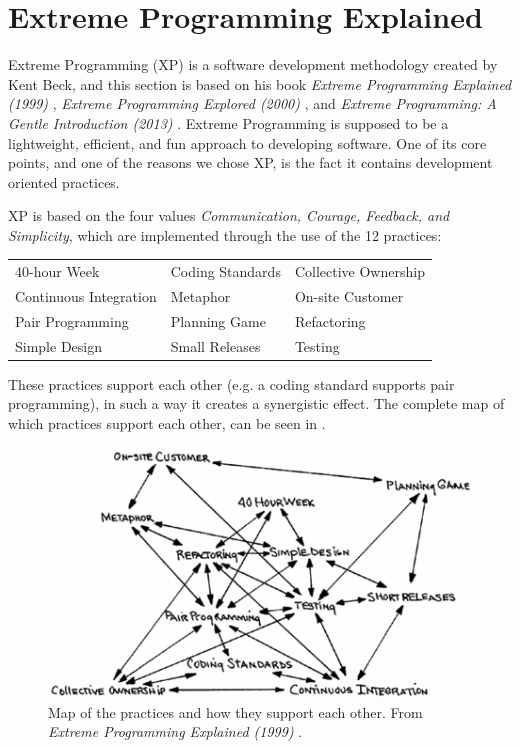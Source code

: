 \section{Extreme Programming Explained}
Extreme Programming (XP) is a software development methodology created by Kent Beck, and this section is based on his book \textit{Extreme Programming Explained (1999)} \citep{xp:explained}, \textit{Extreme Programming Explored (2000)} \citep{xp:explored}, and \textit{Extreme Programming: A Gentle Introduction (2013)} \citep{xp:online}. 
Extreme Programming is supposed to be a lightweight, efficient, and fun approach to developing software.
One of its core points, and one of the reasons we chose XP, is the fact it contains development oriented practices.

\noindent XP is based on the four values \textit{Communication, Courage, Feedback, and Simplicity}, which are implemented through the use of the 12 practices:

\begin{tabularx}{\textwidth}{X X X}
	40-hour Week				 & Coding Standards & Collective Ownership \\
	Continuous Integration	  & Metaphor         	 & On-site Customer     \\
	Pair Programming			& Planning Game		& Refactoring          \\
	Simple Design          		  & Small Releases   	& Testing             
\end{tabularx}

These practices support each other (e.g. a coding standard supports pair programming), in such a way it creates a synergistic effect.
The complete map of which practices support each other, can be seen in .
\begin{figure}[H]
	\centering
	\includegraphics[]{Images/xpPracticeSupport.png}
		\caption{Map of the practices and how they support each other.
			From \textit{Extreme Programming Explained (1999)} \citep[p. 70]{xp:explained}. }
	\label{fig:practiceSupport}
\end{figure}


